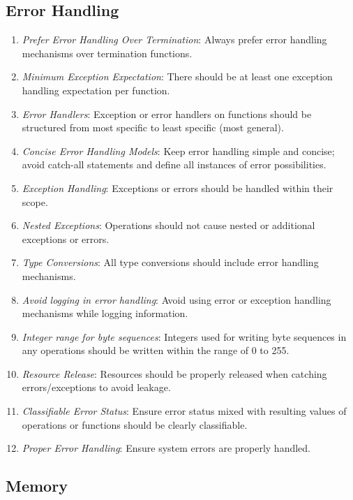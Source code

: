 \documentclass[9pt]{IEEEtran} %
\begin{document}
\subsection{Error Handling}
\label{ESSErrorHandling}

\begin{enumerate}
  \item \textit{Prefer Error Handling Over Termination}: Always prefer error handling mechanisms over termination functions. 
  \item \textit{Minimum Exception Expectation}: There should be at least one exception handling expectation per function.
  \item \textit{Error Handlers}: Exception or error handlers on functions should be structured from most specific to least specific (most general).
  \item \textit{Concise Error Handling Models}: Keep error handling simple and concise; avoid catch-all statements and define all instances of error possibilities.
  \item \textit{Exception Handling}: Exceptions or errors should be handled within their scope.
  \item \textit{Nested Exceptions}: Operations should not cause nested or additional exceptions or errors.
  \item \textit{Type Conversions}: All type conversions should include error handling mechanisms.
  \item \textit{Avoid logging in error handling}: Avoid using error or exception handling mechanisms while logging information.
  \item \textit{Integer range for byte sequences}: Integers used for writing byte sequences in any operations should be written within the range of 0 to 255.
  \item \textit{Resource Release}: Resources should be properly released when catching errors/exceptions to avoid leakage.
  \item \textit{Classifiable Error Status}: Ensure error status mixed with resulting values of operations or functions should be clearly classifiable.
  \item \textit{Proper Error Handling}: Ensure system errors are properly handled.
\end{enumerate}


\subsection{Memory}
\label{ESSMemory}
\end{document}
